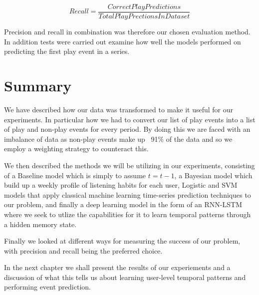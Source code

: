 $$Recall = \frac{CorrectPlayPredictions}{TotalPlayPrectionsInDataset}$$

Precision and recall in combination was therefore our chosen evaluation method. In addition tests were carried out examine how well the models performed on predicting the first play event in a series.



\section{Summary}

We have described how our data was transformed to make it useful for our experiments. In particular how we had to convert our list of play events into a list of play and non-play events for every period. By doing this we are faced with an imbalance of data as non-play events make up ~91\% of the data and so we employ a weighting strategy to counteract this.

We then described the methods we will be utilizing in our experiments, consisting of a Baseline model which is simply to assume $t =t-1$, a Bayesian model which build up a weekly profile of listening habits for each user, Logistic and SVM models that apply classical machine learning time-series prediction techniques to our problem, and finally a deep learning model in the form of an RNN-LSTM where we seek to utlize the capabilities for it to learn temporal patterns through a hidden memory state.

Finally we looked at different ways for measuring the success of our problem, with precision and recall being the preferred choice.

In the next chapter we shall present the results of our experiements and a discussion of what this tells us about learning user-level temporal patterns and performing event prediction.
